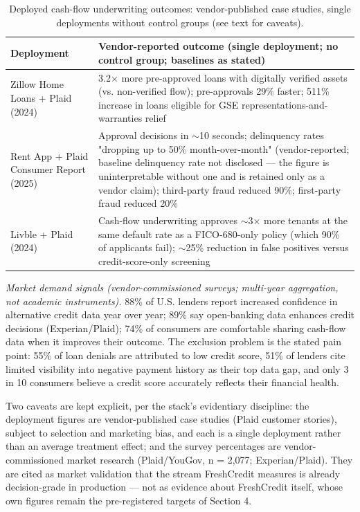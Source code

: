 \documentclass[11pt,twocolumn]{article}
\begin{document}
\begin{table}[t!]
\centering
\footnotesize
\caption{Deployed cash-flow underwriting outcomes: vendor-published case studies, single deployments without control groups (see text for caveats).}\label{tab:vendor}
\begin{tabular}{@{}p{} p{}@{}}
\toprule
Deployment & Vendor-reported outcome (single deployment; no control group; baselines as stated) \\
\midrule
Zillow Home Loans + Plaid (2024) & 3.2$\times$ more pre-approved loans with digitally verified assets (vs. non-verified flow); pre-approvals 29\% faster; 511\% increase in loans eligible for GSE representations-and-warranties relief \\
Rent App + Plaid Consumer Report (2025) & Approval decisions in $\sim$10 seconds; delinquency rates "dropping up to 50\% month-over-month" (vendor-reported; baseline delinquency rate not disclosed --- the figure is uninterpretable without one and is retained only as a vendor claim); third-party fraud reduced 90\%; first-party fraud reduced 20\% \\
Livble + Plaid (2024) & Cash-flow underwriting approves $\sim$3$\times$ more tenants at the same default rate as a FICO-680-only policy (which 90\% of applicants fail); $\sim$25\% reduction in false positives versus credit-score-only screening \\
\bottomrule
\end{tabular}
\end{table}

\emph{Market demand signals (vendor-commissioned surveys; multi-year aggregation, not academic instruments).} 88\% of U.S. lenders report increased confidence in alternative credit data year over year; 89\% say open-banking data enhances credit decisions (Experian/Plaid); 74\% of consumers are comfortable sharing cash-flow data when it improves their outcome. The exclusion problem is the stated pain point: 55\% of loan denials are attributed to low credit score, 51\% of lenders cite limited visibility into negative payment history as their top data gap, and only 3 in 10 consumers believe a credit score accurately reflects their financial health.

Two caveats are kept explicit, per the stack's evidentiary discipline: the deployment figures are vendor-published case studies (Plaid customer stories), subject to selection and marketing bias, and each is a single deployment rather than an average treatment effect; and the survey percentages are vendor-commissioned market research (Plaid/YouGov, n = 2,077; Experian/Plaid). They are cited as market validation that the stream FreshCredit measures is already decision-grade in production --- not as evidence about FreshCredit itself, whose own figures remain the pre-registered targets of Section 4.
\end{document}
